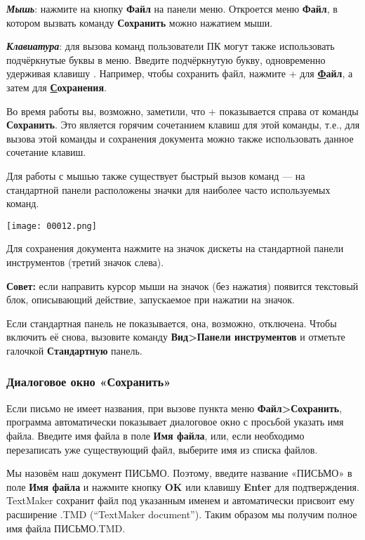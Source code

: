 ﻿\documentclass[a4paper,10pt]{article}
\begin{document}
\textbf{\textit{Мышь}}: нажмите на кнопку \textbf{Файл} на панели меню. Откроется меню \textbf{Файл}, в котором вызвать команду \textbf{Сохранить} можно нажатием мыши.

\textbf{\textit{Клавиатура}}: для вызова команд пользователи ПК могут также использовать подчёркнутые буквы в меню. Введите подчёркнутую букву, одновременно удерживая клавишу . Например, чтобы сохранить файл, нажмите + для \textbf{\underline{Ф}айл}, а затем  для \textbf{\underline{С}охранения}. 

Во время работы вы, возможно, заметили, что + показывается справа от команды \textbf{Сохранить}. Это является горячим сочетанием клавиш для этой команды, т.е., для вызова этой команды и сохранения документа можно также использовать данное сочетание клавиш.

Для работы с мышью также существует быстрый вызов команд — на стандартной панели расположены значки для наиболее часто используемых команд. 

\texttt{[image: 00012.png]}

Для сохранения документа нажмите на значок дискеты на стандартной панели инструментов (третий значок слева).

\begin{mdframed}[backgroundcolor=blue!10]
\textbf{Совет:} если направить курсор мыши на значок (без нажатия) появится текстовый блок, описывающий действие, запускаемое при нажатии на значок.
\end{mdframed}

Если стандартная панель не показывается, она, возможно, отключена. Чтобы включить её снова, вызовите команду \textbf{Вид>Панели инструментов} и отметьте галочкой \textbf{Стандартную} панель. 

\subsubsection{Диалоговое окно «Сохранить»}
Если письмо не имеет названия, при вызове пункта меню \textbf{Файл>Сохранить}, программа автоматически показывает диалоговое окно с просьбой указать имя файла. Введите имя файла в поле \textbf{Имя файла}, или, если необходимо перезаписать уже существующий файл, выберите имя из списка файлов.

Мы назовём наш документ ПИСЬМО. Поэтому, введите название «ПИСЬМО» в поле \textbf{Имя файла} и нажмите кнопку \textbf{OK} или клавишу \textbf{Enter} для подтверждения. TextMaker сохранит файл под указанным именем и автоматически присвоит ему расширение .TMD (“TextMaker document”). Таким образом мы получим полное имя файла ПИСЬМО.TMD.
\end{document}

